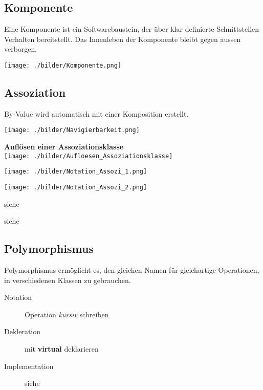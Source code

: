 \subsection{Komponente }
  \begin{minipage}{12cm}
    Eine Komponente ist ein Softwarebaustein, der über klar definierte Schnittstellen Verhalten bereitstellt.
    Das Innenleben der Komponente bleibt gegen aussen verborgen.
  \end{minipage}
  \begin{minipage}{6cm}
    \texttt{[image: ./bilder/Komponente.png]}
  \end{minipage}
  

\subsection{Assoziation }
  By-Value wird automatisch mit einer Komposition erstellt.
  \begin{description}[leftmargin=3.5cm]
    \item[Navigierbarkeit]
      \parbox{5cm}{\texttt{[image: ./bilder/Navigierbarkeit.png]}}
      \hspace{3cm}
      \parbox{8cm}{
      \textbf{Auflösen einer Assoziationsklasse}\\
      \texttt{[image: ./bilder/Aufloesen\_Assoziationsklasse]}}
      
    \item[Notation]
      \parbox{8cm}{\texttt{[image: ./bilder/Notation\_Assozi\_1.png]}}
      \parbox{7cm}{\texttt{[image: ./bilder/Notation\_Assozi\_2.png]}}
    \item[Eigenschaftswerte]
      siehe 
    \item[Implementation]
      siehe 
  \end{description}

\subsection{Polymorphismus }
  Polymorphismus ermöglicht es, den gleichen Namen für gleichartige Operationen,
  in verschiedenen Klassen zu gebrauchen.
  \begin{description}
    \item[Notation]
      Operation \textit{kursiv} schreiben
    \item[Dekleration]
      mit \textbf{virtual} deklarieren
    \item[Implementation]
      siehe 
  \end{description}
  
